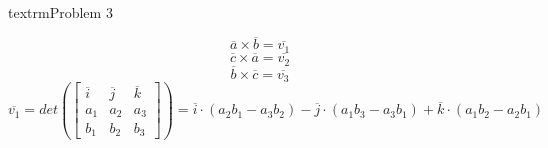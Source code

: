     \begin{center}
        \\textrm{Problem 3}
    \end{center}
    \[\overline{a}\times\overline{b}=\overline{v_1}\]
    \[\overline{c}\times\overline{a}=\overline{v_2}\]
    \[\overline{b}\times\overline{c}=\overline{v_3}\]
    \[\overline{v_1}=det(\begin{bmatrix}
                             \overline{i} & \overline{j} & \overline{k}\\
                             a_1 & a_2 & a_3 \\
                             b_1 & b_2 & b_3
    \end{bmatrix}) = \overline{i}\cdot(a_2b_1 - a_3b_2)-\overline{j}\cdot(a_1b_3 - a_3b_1) + \overline{k}\cdot(a_1b_2-a_2b_1)\]

